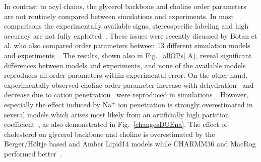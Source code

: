 \documentclass[aps,prl,superscriptaddress,twocolumn]{revtex4}
\begin{document}
In contrast to acyl chains, the glycerol backbone and choline order parameters are not routinely
compared between simulations and experiments. In most comparisons the experimentally available signs,
stereospecific labeling and high accuracy are not fully exploited~\cite{shinoda97,hogberg06,klauda10,poger12,dickson12,botan15,hogberg08,kapla12}.
These issues were recently dicussed by Botan et al. who also compared order parameters 
between 13 different simulation models and experiments~\cite{botan15}. The results, shown also in Fig.~\ref{allOPs} A),
reveal significant differences between models and experiments, and none of the available models
reproduces all order parameters within experimental error.
On the other hand, experimentally observed choline order parameter increase with 
dehydration~\cite{bechinger91,ulrich94,dvinskikh05b} and decrease due to cation 
penetration~\cite{akutsu81,altenbach84} were reproduced in simulations~\cite{botan15,ionpaper}.
However, especially the effect induced by Na$^+$ ion penetration is strongly overestimated
in several models which arises most likely from an artificially high partition coefficient~\cite{ionpaper},
as also demonstrated in Fig.~\ref{changesDUEna}.
The effect of cholesterol on glycerol backbone and choline is overestimated
by the Berger/H{\"o}ltje based \cite{ferreira13} and Amber Lipid14 \cite{madej15} models 
while CHARMM36 and MacRog performed better~\cite{botan15}. 
\end{document}
